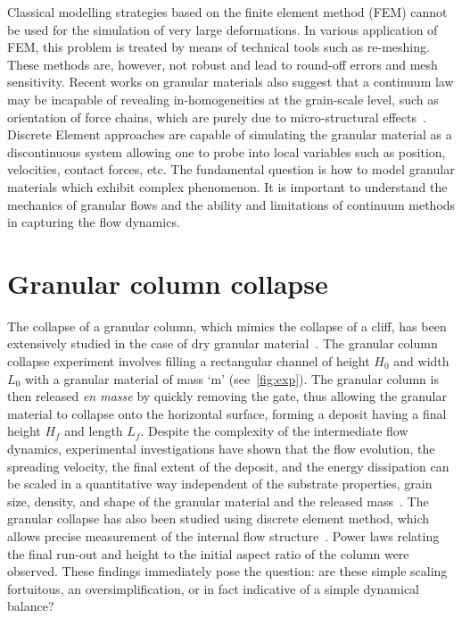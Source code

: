 Classical modelling strategies based on the finite element method (FEM) cannot 
be used for the simulation of very large deformations. In various application 
of FEM, this problem is treated by means of technical tools such as re-meshing. 
These methods are, however, not robust and lead to round-off errors and mesh 
sensitivity. Recent works on granular materials also suggest that a continuum 
law may be incapable of revealing in-homogeneities at the grain-scale level, 
such as orientation of force chains, which are purely due to micro-structural 
effects~\citep{Rycroft2009a}. Discrete Element approaches are capable of 
simulating the granular material as a discontinuous system allowing one to 
probe into local variables such as position, velocities, contact forces, etc. 
The fundamental question is how to model granular materials which exhibit 
complex phenomenon. It is important to understand the mechanics of granular 
flows and the ability and limitations of continuum methods in capturing the 
flow dynamics.

\section{Granular column collapse}

The collapse of a granular column, which mimics the
collapse of a cliff, has been extensively studied in the case of
dry granular 
material~\citep{Lube2005,Lajeunesse2004,Kerswell2005,Zenit2005,Staron2007a,Hogg2007,Lo2009}.
The granular column collapse experiment involves filling a rectangular channel 
of height $H_0$ and width $L_0$ with a granular material of mass 
`m' (see~\cref{fig:exp}). The granular column is then released \textit{en 
masse} by quickly removing the gate, thus allowing the granular material to 
collapse onto the horizontal surface, forming a deposit having a final height 
$H_f$ and length $L_f$. Despite the complexity of the intermediate flow 
dynamics, experimental investigations have shown that the flow evolution, the 
spreading velocity, the final extent of the deposit, and the energy dissipation 
can be scaled in a quantitative way independent of the substrate properties, 
grain size, density, and shape of the granular material and the released 
mass~\citep{Staron2007a,Lajeunesse2005,Lube2005}. The granular collapse has 
also been studied using discrete element method, which allows precise 
measurement of the internal flow 
structure~\citep{Lo2009,Staron2005,Staron2007a,Utili2014}.
Power laws relating the final run-out and height to the initial aspect ratio of 
the column were observed. These findings immediately pose the question: are 
these simple scaling fortuitous, an oversimplification, or in fact indicative 
of a simple dynamical balance? 


